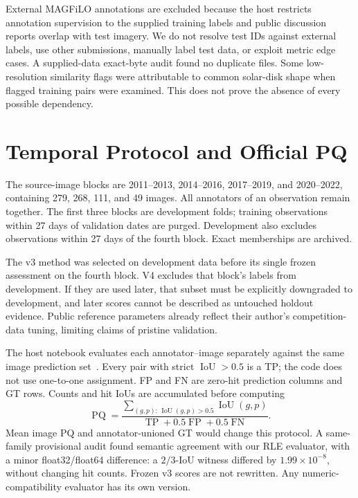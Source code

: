 \documentclass[sigconf]{acmart}
\begin{document}
External MAGFiLO annotations are excluded because the host restricts annotation supervision to the supplied training labels and public discussion reports overlap with test imagery. We do not resolve test IDs against external labels, use other submissions, manually label test data, or exploit metric edge cases. A supplied-data exact-byte audit found no duplicate files. Some low-resolution similarity flags were attributable to common solar-disk shape when flagged training pairs were examined. This does not prove the absence of every possible dependency.

\section{Temporal Protocol and Official PQ}
The source-image blocks are 2011--2013, 2014--2016, 2017--2019, and 2020--2022, containing 279, 268, 111, and 49 images. All annotators of an observation remain together. The first three blocks are development folds; training observations within 27 days of validation dates are purged. Development also excludes observations within 27 days of the fourth block. Exact memberships are archived.

The v3 method was selected on development data before its single frozen assessment on the fourth block. V4 excludes that block's labels from development. If they are used later, that subset must be explicitly downgraded to development, and later scores cannot be described as untouched holdout evidence. Public reference parameters already reflect their author's competition-data tuning, limiting claims of pristine validation.

The host notebook evaluates each annotator--image separately against the same image prediction set~\cite{selfeval}. Every pair with strict $\operatorname{IoU}>0.5$ is a TP; the code does not use one-to-one assignment. FP and FN are zero-hit prediction columns and GT rows. Counts and hit IoUs are accumulated before computing
\begin{equation}
 \operatorname{PQ} =
 \frac{\sum_{(g,p):\,\operatorname{IoU}(g,p)>0.5}\operatorname{IoU}(g,p)}
 {\operatorname{TP}+0.5\operatorname{FP}+0.5\operatorname{FN}}.
\end{equation}
Mean image PQ and annotator-unioned GT would change this protocol. A same-family provisional audit found semantic agreement with our RLE evaluator, with a minor float32/float64 difference: a $2/3$-IoU witness differed by $1.99\times10^{-8}$, without changing hit counts. Frozen v3 scores are not rewritten. Any numeric-compatibility evaluator has its own version.
\end{document}
